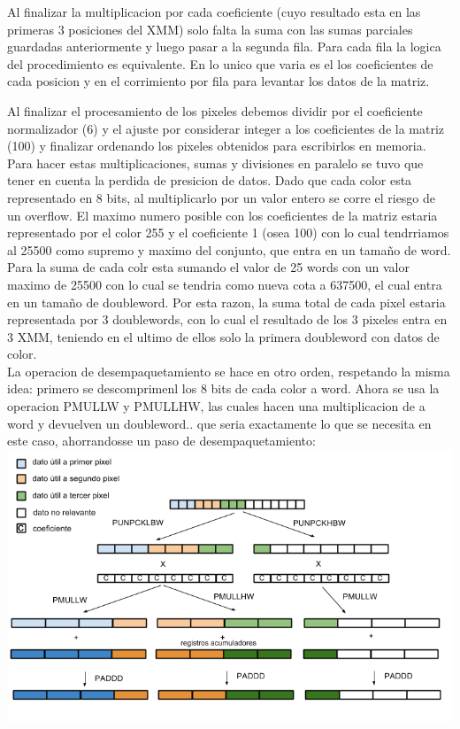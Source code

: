 Al finalizar la multiplicacion por cada coeficiente (cuyo resultado esta en las primeras 3 posiciones del XMM) solo falta la suma con las sumas parciales guardadas anteriormente y luego pasar a la segunda fila. Para cada fila la logica del procedimiento es equivalente. En lo unico que varia es el los coeficientes de cada posicion y en el corrimiento por fila para levantar los datos de la matriz.

Al finalizar el procesamiento de los pixeles debemos dividir por el coeficiente normalizador (6) y el ajuste por considerar integer a los coeficientes de la matriz (100) y finalizar ordenando los pixeles obtenidos para escribirlos en memoria.\\


Para hacer estas multiplicaciones, sumas y divisiones en paralelo se tuvo que tener en cuenta la perdida de presicion de datos. Dado que cada color esta representado en 8 bits, al multiplicarlo por un valor entero se corre el riesgo de un overflow. El maximo numero posible con los coeficientes de la matriz estaria representado por el color 255 y el coeficiente 1 (osea 100) con lo cual tendrriamos al 25500 como supremo y maximo del conjunto, que entra en un tamaño de word.\\



Para la suma de cada colr esta sumando el valor de 25 words con un valor maximo de 25500 con lo cual se tendria como nueva cota a 637500, el cual entra en un tamaño de doubleword. Por esta razon, la suma total de cada pixel estaria representada por 3 doublewords, con lo cual el resultado de los 3 pixeles entra en 3 XMM, teniendo en el ultimo de ellos solo la primera doubleword con datos de color.\\

La operacion de desempaquetamiento se hace en otro orden, respetando la misma idea: primero se descomprimenl los 8 bits de cada color a word. Ahora se usa la operacion PMULLW y PMULLHW, las cuales hacen una multiplicacion de a word y devuelven un doubleword.. que seria exactamente lo que se necesita en este caso, ahorrandosse un paso de desempaquetamiento:\\


\includegraphics[scale=0.5]{imagenes/operaciones-xmms-fila.png}




